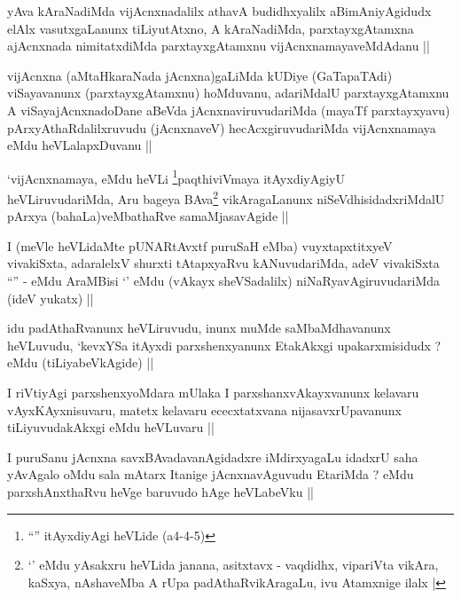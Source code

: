 \begin{artha}
yAva kAraNadiMda vijAcnxnadalilx athavA budidhxyalilx aBimAniyAgidudx elAlx vasutxgaLanunx tiLiyutAtxno, A kAraNadiMda, parxtayxgAtamxna ajAcnxnada nimitatxdiMda parxtayxgAtamxnu vijAcnxnamayaveMdAdanu ||
\end{artha}


\begin{artha}
vijAcnxna (aMtaHkaraNada jAcnxna)gaLiMda kUDiye (GaTapaTAdi) viSayavanunx (parxtayxgAtamxnu) hoMduvanu, adariMdalU parxtayxgAtamxnu A viSayajAcnxnadoDane aBeVda jAcnxnaviruvudariMda (mayaTf parxtayxyavu) pArxyAthaRdalilxruvudu (jAcnxnaveV) hecAcxgiruvudariMda vijAcnxnamaya eMdu heVLalapxDuvanu ||
\end{artha}

\begin{artha}
`vijAcnxnamaya, eMdu heVLi \footnote{``\stext'' itAyxdiyAgi heVLide (a4-4-5)}paqthiviVmaya itAyxdiyAgiyU heVLiruvudariMda, Aru bageya BAva\footnote{`\stext' eMdu yAsakxru heVLida janana, asitxtavx - vaqdidhx, vipariVta vikAra, kaSxya, nAshaveMba A rUpa padAthaRvikAragaLu, ivu Atamxnige ilalx |} vikAragaLanunx niSeVdhisidadxriMdalU pArxya (bahaLa)veMbathaRve samaMjasavAgide ||
\end{artha}


\begin{artha}
I (meVle heVLidaMte pUNARtAvxtf puruSaH eMba) vuyxtapxtitxyeV vivakiSxta, adaralelxV shurxti tAtapxyaRvu kANuvudariMda, adeV vivakiSxta ``\stext'' - eMdu AraMBisi `\stext' eMdu (vAkayx sheVSadalilx) niNaRyavAgiruvudariMda (ideV yukatx) ||
\end{artha}

\begin{artha}
idu padAthaRvanunx heVLiruvudu, inunx muMde saMbaMdhavanunx heVLuvudu, `kevxYSa itAyxdi parxshenxyanunx EtakAkxgi upakarxmisidudx ? eMdu (tiLiyabeVkAgide) ||
\end{artha}

\begin{artha}
I riVtiyAgi parxshenxyoMdara mUlaka I parxshanxvAkayxvanunx kelavaru vAyxKAyxnisuvaru, matetx kelavaru ececxtatxvana nijasavxrUpavanunx tiLiyuvudakAkxgi eMdu heVLuvaru ||
\end{artha}

\begin{artha}
I puruSanu jAcnxna savxBAvadavanAgidadxre iMdirxyagaLu idadxrU saha yAvAgalo oMdu sala mAtarx Itanige jAcnxnavAguvudu EtariMda ? eMdu parxshAnxthaRvu heVge baruvudo hAge heVLabeVku ||
\end{artha}

